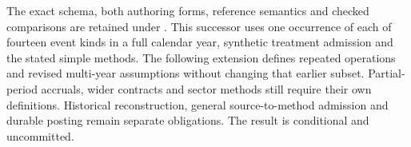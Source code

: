 The exact schema, both authoring forms, reference semantics and checked
comparisons are retained under
. This successor
uses one occurrence of each of fourteen event kinds in a full calendar
year, synthetic treatment admission and the stated simple methods. The
following extension defines repeated operations and revised multi-year
assumptions without changing that earlier subset. Partial-period accruals,
wider contracts and sector methods still require their own definitions.
Historical reconstruction, general source-to-method admission and durable
posting remain separate obligations. The result is conditional and uncommitted.



